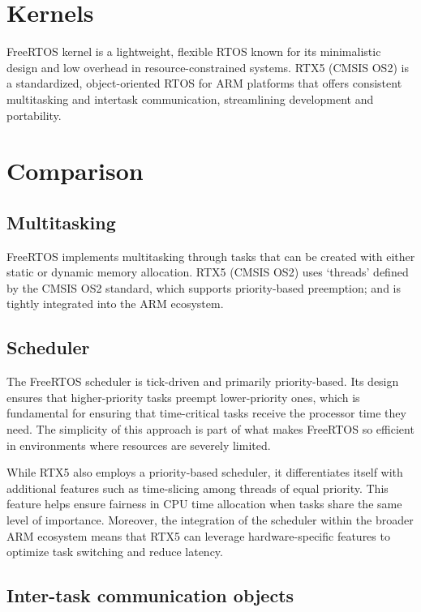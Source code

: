 \section*{Kernels}

FreeRTOS kernel is a lightweight, flexible RTOS known for its minimalistic design and low overhead in resource-constrained systems.
RTX5 (CMSIS OS2) is a standardized, object-oriented RTOS for ARM platforms that offers consistent multitasking and intertask communication, streamlining development and portability.

\section*{Comparison}

\subsection*{Multitasking}

FreeRTOS implements multitasking through tasks that can be created with either static or dynamic memory allocation.
RTX5 (CMSIS OS2) uses `threads' defined by the CMSIS OS2 standard, which supports priority-based preemption; and is tightly integrated into the ARM ecosystem.

\subsection*{Scheduler}

The FreeRTOS scheduler is tick-driven and primarily priority-based. Its design ensures that higher-priority tasks preempt lower-priority ones, which is fundamental for ensuring that time-critical tasks receive the processor time they need.
The simplicity of this approach is part of what makes FreeRTOS so efficient in environments where resources are severely limited.

While RTX5 also employs a priority-based scheduler, it differentiates itself with additional features such as time-slicing among threads of equal priority.
This feature helps ensure fairness in CPU time allocation when tasks share the same level of importance.
Moreover, the integration of the scheduler within the broader ARM ecosystem means that RTX5 can leverage hardware-specific features to optimize task switching and reduce latency.

\subsection*{Inter-task communication objects}

